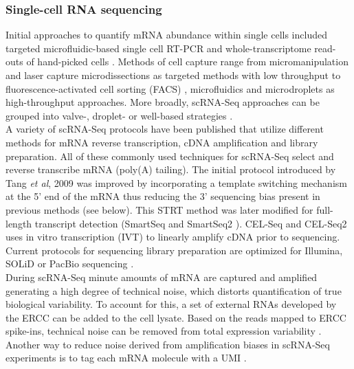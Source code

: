 \subsubsection{Single-cell RNA sequencing}

Initial approaches to quantify mRNA abundance within single cells included targeted microfluidic-based single cell RT-PCR \citep{Warren2006} and whole-transcriptome read-outs of hand-picked cells \citep{Tang2009}. Methods of cell capture range from micromanipulation \citep{Grindberg2014} and laser capture microdissections \citep{Frumkin2008} as targeted methods with low throughput to  fluorescence-activated cell sorting (FACS) \citep{Hayashi2010, Dalerba2011, Jaitin2014}, microfluidics \citep{Trapnell2014, Treutlein2014} and microdroplets \citep{Klein2015, Macosko2015} as high-throughput approaches. More broadly, \gls{scRNA-Seq} approaches can be grouped into valve-, droplet- or well-based strategies \citep{Prakadan2017}. \\

A variety of scRNA-Seq protocols have been published that utilize different methods for mRNA reverse transcription, cDNA amplification and library preparation. All of these commonly used techniques for scRNA-Seq select and reverse transcribe mRNA (poly(A) tailing). The initial protocol introduced by Tang \textit{et al}, 2009 \citep{Tang2009} was improved by incorporating a template switching mechanism at the 5' end of the mRNA thus reducing the 3' sequencing bias present in previous methods \citep{Islam2011} (see below). This \gls{STRT} method was later modified for full-length transcript detection (SmartSeq \citep{Ramskold2012} and SmartSeq2 \citep{Picelli2013}). CEL-Seq \citep{Hashimshony2012} and CEL-Seq2 \citep{Hashimshony2016} uses in vitro transcription (IVT) to linearly amplify cDNA prior to sequencing. Current protocols for sequencing library preparation are optimized for Illumina, SOLiD or PacBio sequencing \citep{Kolodziejczyk2015review}. \\

During scRNA-Seq minute amounts of mRNA are captured and amplified generating a high degree of technical noise, which distorts quantification of true biological variability. To account for this, a set of external RNAs developed by the \gls{ERCC} \citep{Rna2005} can be added to the cell lysate. Based on the reads mapped to ERCC spike-ins, technical noise can be removed from total expression variability \citep{Brennecke2013, Vallejos2015BASiCS}. Another way to reduce noise derived from amplification biases in scRNA-Seq experiments is to tag each mRNA molecule with a \gls{UMI} \citep{Kivioja2011, Islam2014}.\\

